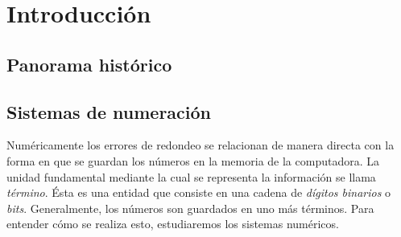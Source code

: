 \chapter{Introducción}

\section{Panorama histórico}

\section{Sistemas de numeración}

Numéricamente los errores de redondeo se relacionan de manera directa con la forma en que se guardan los números en la memoria de la computadora. 
La unidad fundamental mediante la cual se representa la información se llama \textit{término}. Ésta es una entidad que consiste en una cadena de 
\textit{dígitos binarios} o \textit{bits}. Generalmente, los números son guardados en uno más términos. Para entender cómo se realiza esto, 
estudiaremos los sistemas numéricos.

